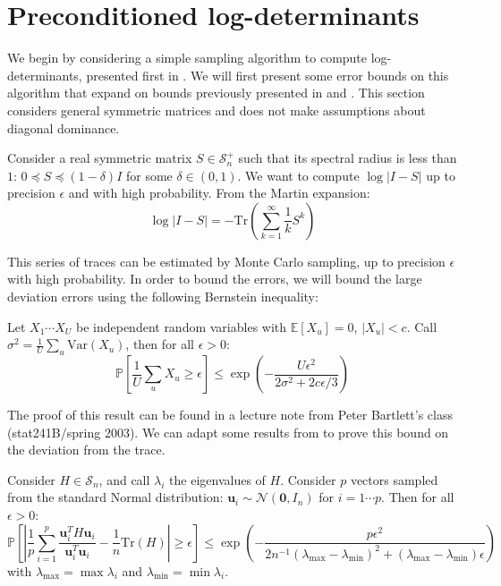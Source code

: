 
\section{Preconditioned log-determinants\label{sec:Preconditioned-log-determinants}}

We begin by considering a simple sampling algorithm to compute log-determinants,
presented first in \cite{Barry1999}. We will first present some error
bounds on this algorithm that expand on bounds previously presented
in \cite{Bai1996} and \cite{Barry1999}. This section considers general
symmetric matrices and does not make assumptions about diagonal dominance.

Consider a real symmetric matrix $S\in\mathcal{S}_{n}^{+}$ such that
its spectral radius is less than $1$: $0\preceq S\preceq\left(1-\delta\right)I$
for some $\delta\in\left(0,1\right)$. We want to compute $\log\left|I-S\right|$
up to precision $\epsilon$ and with high probability. From the Martin
expansion: 
\begin{equation}
\log\left|I-S\right|=-\mbox{Tr}\left(\sum_{k=1}^{\infty}\frac{1}{k}S^{k}\right)\label{eq:martin}
\end{equation}


This series of traces can be estimated by Monte Carlo sampling, up
to precision $\epsilon$ with high probability. In order to bound
the errors, we will bound the large deviation errors using the following
Bernstein inequality:

\begin{lemma} \label{lem:bernstein}Let $X_{1}\cdots X_{U}$ be independent
random variables with $\mathbb{E}\left[X_{u}\right]=0$, $\left|X_{u}\right|<c$.
Call $\sigma^{2}=\frac{1}{U}\sum_{u}\text{Var}\left(X_{u}\right)$,
then for all $\epsilon>0$: 
\[
\mathbb{P}\left[\frac{1}{U}\sum_{u}X_{u}\geq\epsilon\right]\leq\exp\left(-\frac{U\epsilon^{2}}{2\sigma^{2}+2c\epsilon/3}\right)
\]


\end{lemma}

The proof of this result can be found in a lecture note from Peter
Bartlett's class (stat241B/spring 2003). We can adapt some results
from \cite{Barry1999} to prove this bound on the deviation from the
trace.

\begin{lemma} \label{lem:bernstein-trace}Consider $H\in\mathcal{S}_{n}$,
and call $\lambda_{i}$ the eigenvalues of $H$. Consider $p$ vectors
sampled from the standard Normal distribution: $\mathbf{u}_{i}\sim\mathcal{N}\left(\mathbf{0},I_{n}\right)$
for $i=1\cdots p$. Then for all $\epsilon>0$: 
\[
\mathbb{P}\left[\left|\frac{1}{p}\sum_{i=1}^{p}\frac{\mathbf{u}_{i}^{T}H\mathbf{u}_{i}}{\mathbf{u}_{i}^{T}\mathbf{u}_{i}}-\frac{1}{n}\mbox{Tr}\left(H\right)\right|\geq\epsilon\right]\leq\exp\left(-\frac{p\epsilon^{2}}{2n^{-1}\left(\lambda_{\max}-\lambda_{\min}\right)^{2}+\left(\lambda_{\max}-\lambda_{\min}\right)\epsilon}\right)
\]
with $\lambda_{\text{max}}=\max\lambda_{i}$ and $\lambda_{\min}=\min\lambda_{i}$.\end{lemma} 

